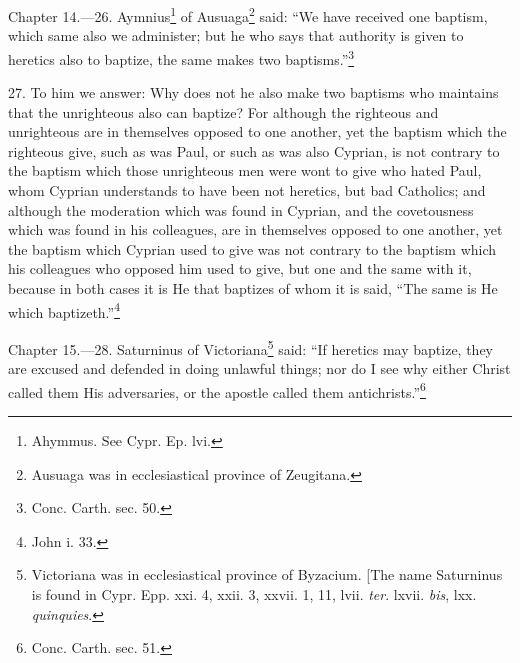 
Chapter 14.—26. Aymnius\footnote{\par  Ahymmus. See Cypr. Ep. lvi.} of Ausuaga\footnote{\par  Ausuaga was in ecclesiastical province of Zeugitana.} said: ``We have received one baptism, which same also we administer; but he who says that authority is given to heretics also to baptize, the same makes two baptisms.''\footnote{\par  Conc. Carth. sec. 50.}

27. To him we answer: Why does not he also make two baptisms who maintains that the unrighteous also can baptize? For although the righteous and unrighteous are in themselves opposed to one another, yet the baptism which the righteous give, such as was Paul, or such as was also Cyprian, is not contrary to the baptism which those unrighteous men were wont to give who hated Paul, whom Cyprian understands to have been not heretics, but bad Catholics; and although the moderation which was found in Cyprian, and the covetousness which was found in his colleagues, are in themselves opposed to one another, yet the baptism which Cyprian used to give was not contrary to the baptism which his colleagues who opposed him used to give, but one and the same with it, because in both cases it is He that baptizes of whom it is said, ``The same is He which baptizeth.''\footnote{\par  John i. 33.}


Chapter 15.—28. Saturninus of Victoriana\footnote{\par  Victoriana was in ecclesiastical province of Byzacium. [The name Saturninus is found in Cypr. Epp. xxi. 4, xxii. 3, xxvii. 1, 11, lvii. \emph{ter}. lxvii. \emph{bis}, lxx. \emph{quinquies}.} said: ``If heretics may baptize, they are excused and defended in doing unlawful things; nor do I see why either Christ called them His adversaries, or the apostle called them antichrists.''\footnote{\par  Conc. Carth. sec. 51.}

